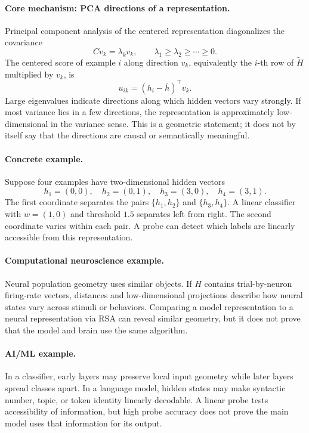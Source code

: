 \paragraph{Core mechanism: PCA directions of a representation.}
Principal component analysis of the centered representation diagonalizes the covariance
\[
C v_k=\lambda_k v_k,
\qquad
\lambda_1\geq\lambda_2\geq\cdots\geq0.
\]
The centered score of example \(i\) along direction \(v_k\), equivalently the \(i\)-th row of \(\widetilde H\) multiplied by \(v_k\), is
\[
u_{ik}=(h_i-\bar h)^\top v_k.
\]
Large eigenvalues indicate directions along which hidden vectors vary strongly. If most variance lies in a few directions, the representation is approximately low-dimensional in the variance sense. This is a geometric statement; it does not by itself say that the directions are causal or semantically meaningful.

\paragraph{Concrete example.}
Suppose four examples have two-dimensional hidden vectors
\[
h_1=(0,0),\quad h_2=(0,1),\quad h_3=(3,0),\quad h_4=(3,1).
\]
The first coordinate separates the pairs \(\{h_1,h_2\}\) and \(\{h_3,h_4\}\). A linear classifier with \(w=(1,0)\) and threshold \(1.5\) separates left from right. The second coordinate varies within each pair. A probe can detect which labels are linearly accessible from this representation.

\paragraph{Computational neuroscience example.}
Neural population geometry uses similar objects. If \(H\) contains trial-by-neuron firing-rate vectors, distances and low-dimensional projections describe how neural states vary across stimuli or behaviors. Comparing a model representation to a neural representation via RSA can reveal similar geometry, but it does not prove that the model and brain use the same algorithm.

\paragraph{AI/ML example.}
In a classifier, early layers may preserve local input geometry while later layers spread classes apart. In a language model, hidden states may make syntactic number, topic, or token identity linearly decodable. A linear probe tests accessibility of information, but high probe accuracy does not prove the main model uses that information for its output.


